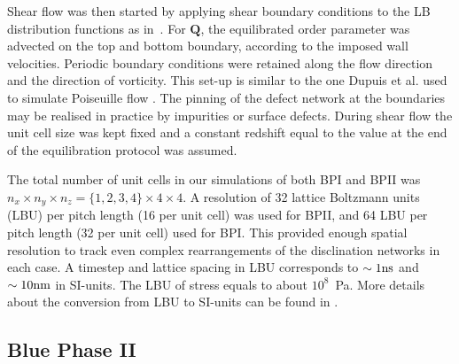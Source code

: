 \documentclass[12pt,twoside]{iopart}
\begin{document}
Shear flow was then started by applying shear boundary conditions to the LB distribution functions as in~\cite{Denniston:2004}. For ${\mathbf Q}$, the equilibrated order parameter was advected on the top and bottom boundary, according to the imposed wall velocities. Periodic boundary conditions were retained along the flow direction and the direction of vorticity.
This set-up is similar to the one Dupuis et al. used to simulate Poiseuille flow \cite{Dupuis:2005}. The pinning of the defect network at the boundaries may be realised in practice by impurities or surface defects.
During shear flow the unit cell size was kept fixed and a constant redshift equal to the value at the end of the equilibration protocol was assumed.

The total number of unit cells in our simulations of both BPI and BPII
was $n_x\times n_y \times n_z= \{1,2,3,4\} \times 4\times 4$.
A resolution of 32 lattice Boltzmann units (LBU) per pitch length
(16 per unit cell) was used for BPII, and 64 LBU per pitch length
(32 per unit cell) used for BPI.  
This provided enough spatial resolution to track even complex rearrangements
of the disclination networks in each case.
A timestep and lattice spacing in LBU corresponds to $\sim 1 {\rm ns}$ and $\sim 10{\rm nm}$ in SI-units.
The LBU of stress equals to about $10^8$~Pa. 
More details about the conversion from LBU to SI-units can be found in \cite{Henrich:2010b,Henrich:2011a}.

\subsection{Blue Phase II}\label{sec_bpii}
\end{document}
